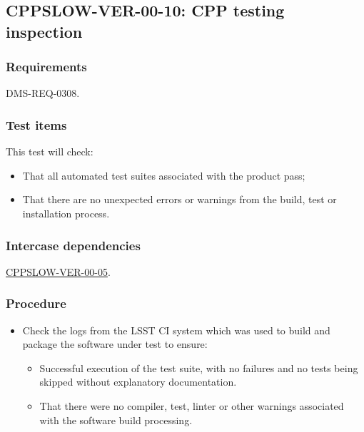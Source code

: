 \subsection{CPPSLOW-VER-00-10: CPP testing inspection}
\label{cppslow-ver-00-10}

\subsubsection{Requirements}

DMS-REQ-0308.

\subsubsection{Test items}

This test will check:

\begin{itemize}

  \item{That all automated test suites associated with the product pass;}
  \item{That there are no unexpected errors or warnings from the build, test
  or installation process.}

\end{itemize}

\subsubsection{Intercase dependencies}

\hyperref[cppslow-ver-00-05]{CPPSLOW-VER-00-05}.

\subsubsection{Procedure}

\begin{itemize}

  \item{Check the logs from the LSST CI system which was used to build and
  package the software under test to ensure:

    \begin{itemize}

      \item{Successful execution of the test suite, with no failures and no
      tests being skipped without explanatory documentation.}

      \item{That there were no compiler, test, linter or other warnings
      associated with the software build processing.}

    \end{itemize}
  }

\end{itemize}
